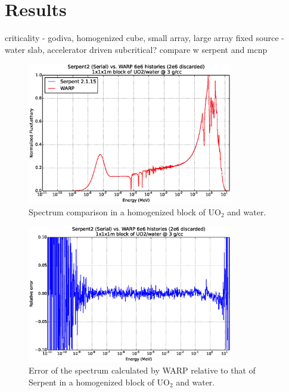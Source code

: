 \chapter{Results}
\label{chap:results}


criticality - godiva, homogenized cube,  small array, large array
fixed source - water slab, accelerator driven subcritical?
compare w serpent and mcnp

\begin{figure}[h!] 
\centering
\includegraphics[width=0.8\textwidth]{graphics/homfuel_spec.eps}
\caption{Spectrum comparison in a homogenized block of UO$_2$ and water. \label{homfuel_spec} }
\end{figure}

\begin{figure}[h!] 
\centering
\includegraphics[width=0.8\textwidth]{graphics/homfuel_spec_err.eps}
\caption{Error of the spectrum calculated by WARP relative to that of Serpent in a homogenized block of UO$_2$ and water. \label{homfuel_spec_err} }
\end{figure}

